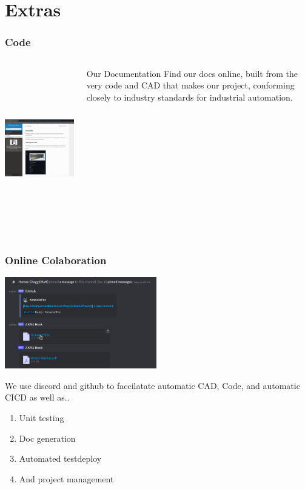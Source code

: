 \documentclass[aspectratio=169]{beamer}
\begin{document}
\section{Extras}
\begin{frame}
    \frametitle{Code}

    \begin{columns}
        \begin{column}{0.58\textwidth}
            \includegraphics[height=7cm]{ManualOnline}
        \end{column}

        \begin{column}{0.38\textwidth}
            \begin{block}{Our Documentation}
                Find our docs online, built from the very code and CAD that
                makes our project, conforming closely to industry standards
                for industrial automation.
            \end{block}
        \end{column}
    \end{columns}
\end{frame}

\begin{frame}
    \frametitle{Online Colaboration}

    \includegraphics[height=4cm]{DevelopmentDiscouse}

    We use discord and github to faccilatate automatic CAD, Code, and automatic
    CI\/CD as well as..

    \begin{enumerate}
     \item Unit testing
     \item Doc generation
     \item Automated test\/deploy
     \item And project management
    \end{enumerate}
\end{frame}
\end{document}
